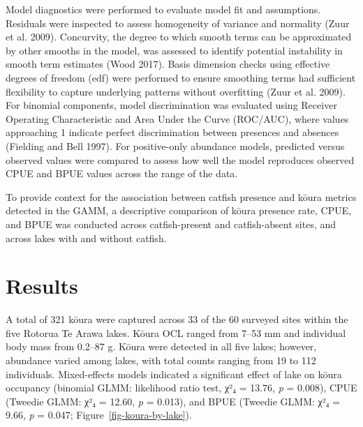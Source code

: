 \documentclass[
  12pt,
  a4paper,
]{scrbook}
\begin{document}
Model diagnostics were performed to evaluate model fit and assumptions.
Residuals were inspected to assess homogeneity of variance and normality
(Zuur et al. 2009). Concurvity, the degree to which smooth terms can be
approximated by other smooths in the model, was assessed to identify
potential instability in smooth term estimates (Wood 2017). Basis
dimension checks using effective degrees of freedom (edf) were performed
to ensure smoothing terms had sufficient flexibility to capture
underlying patterns without overfitting (Zuur et al. 2009). For binomial
components, model discrimination was evaluated using Receiver Operating
Characteristic and Area Under the Curve (ROC/AUC), where values
approaching 1 indicate perfect discrimination between presences and
absences (Fielding and Bell 1997). For positive-only abundance models,
predicted versus observed values were compared to assess how well the
model reproduces observed CPUE and BPUE values across the range of the
data.

To provide context for the association between catfish presence and
kōura metrics detected in the GAMM, a descriptive comparison of kōura
presence rate, CPUE, and BPUE was conducted across catfish-present and
catfish-absent sites, and across lakes with and without catfish.


\chapter{Results}\label{results-1}

A total of 321 kōura were captured across 33 of the 60 surveyed sites
within the five Rotorua Te Arawa lakes. Kōura OCL ranged from 7--53 mm
and individual body mass from 0.2--87 g. Kōura were detected in all five
lakes; however, abundance varied among lakes, with total counts ranging
from 19 to 112 individuals. Mixed-effects models indicated a significant
effect of lake on kōura occupancy (binomial GLMM: likelihood ratio test,
χ²₄ = 13.76, \emph{p} = 0.008), CPUE (Tweedie GLMM: χ²₄ = 12.60,
\emph{p} = 0.013), and BPUE (Tweedie GLMM: χ²₄ = 9.66, \emph{p} = 0.047;
Figure~\ref{fig-koura-by-lake}).
\end{document}
